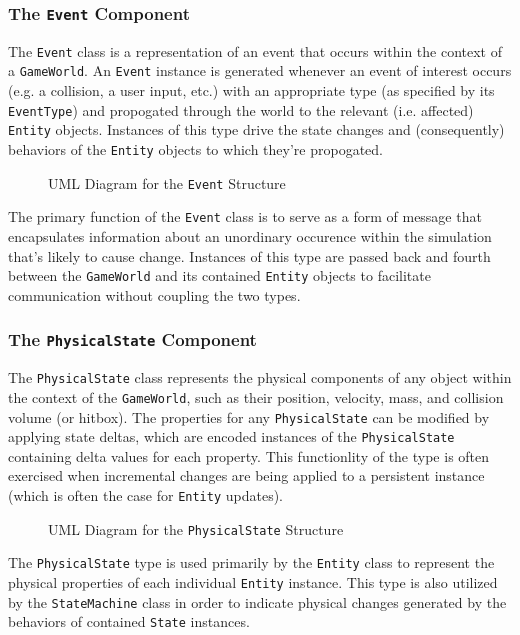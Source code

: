 \documentclass{article}
\newcommand{\classname}[1] {\texttt{#1}}
\newcommand{\insertdiagram}[2]
{
	\begin{figure}[H]
		\centering
		\fbox{\texttt{[image: figures/\#1]}}
		\caption{UML Diagram for the \classname{#1} Structure}
	\end{figure}
}
\begin{document}
			\subsubsection[\classname{Event}]{The \classname{Event} Component}
			The \classname{Event} class is a representation of an event that occurs 
			within the context of a \classname{GameWorld}.  An \classname{Event} 
			instance is generated whenever an event of interest occurs (e.g. a 
			collision, a user input, etc.) with an appropriate type (as specified 
			by its \classname{EventType}) and propogated through the world to the 
			relevant (i.e. affected) \classname{Entity} objects.  Instances of this 
			type drive the state changes and (consequently) behaviors of the 
			\classname{Entity} objects to which they're propogated.

			\insertdiagram{Event}{2.0in}

			The primary function of the \classname{Event} class is to serve as
			a form of message that encapsulates information about an unordinary
			occurence within the simulation that's likely to cause change.
			Instances of this type are passed back and fourth between the
			\classname{GameWorld} and its contained \classname{Entity} objects 
			to facilitate communication without coupling the two types.  

			\subsubsection[\classname{PhysicalState}]{The \classname{PhysicalState} Component}
			The \classname{PhysicalState} class represents the physical components 
			of any object within the context of the \classname{GameWorld}, such as
			their position, velocity, mass, and collision volume (or hitbox).
			The properties for any \classname{PhysicalState} can be modified by 
			applying state deltas, which are encoded instances of the 
			\classname{PhysicalState} containing delta values for each property.
			This functionlity of the type is often exercised when incremental
			changes are being applied to a persistent instance (which is often
			the case for \classname{Entity} updates).

			\insertdiagram{PhysicalState}{3.0in}

			The \classname{PhysicalState} type is used primarily by the
			\classname{Entity} class to represent the physical properties of
			each individual \classname{Entity} instance.  This type is also
			utilized by the \classname{StateMachine} class in order to 
			indicate physical changes generated by the behaviors of contained
			\classname{State} instances.
\end{document}
